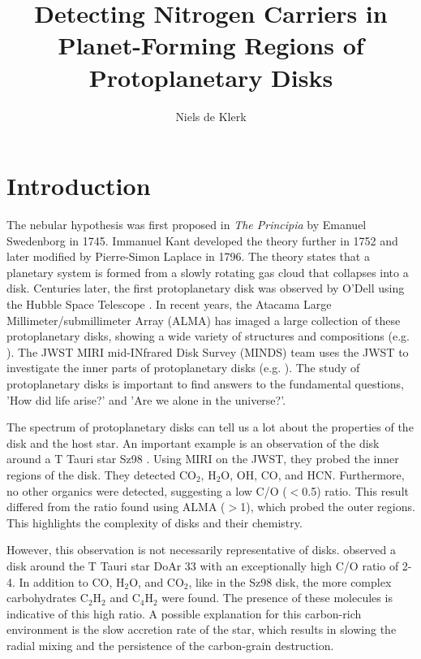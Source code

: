 \documentclass[twoside, single, authoryear, semicolon, 12pt]{lion-msc}
\title{Detecting Nitrogen Carriers in Planet-Forming Regions of Protoplanetary Disks}
\author{Niels de Klerk}
\affiliation{Leiden Observatory, Universiteit Leiden}
\date{\displaydate{date}}
\newcommand{\4}{$_4$}
\newcommand{\3}{$_3$}
\newcommand{\2}{$_2$}
\begin{document}

\maketitle

\tableofcontents
\cleardoublepage
{}
\chapter{Introduction}
The nebular hypothesis was first proposed in \textit{The Principia} by Emanuel Swedenborg in 1745. Immanuel Kant developed the theory further in 1752 and later modified by Pierre-Simon Laplace in 1796. The theory states that a planetary system is formed from a slowly rotating gas cloud that collapses into a disk. Centuries later, the first protoplanetary disk was observed by O'Dell using the Hubble Space Telescope \citep{ODell1993}. In recent years, the Atacama Large Millimeter/submillimeter Array (ALMA) has imaged a large collection of these protoplanetary disks, showing a wide variety of structures and compositions (e.g. \cite{gardner2025exoalmaxialmaobservations, shoshi2025alma2dsuperresolutionimaging}). The JWST MIRI mid-INfrared Disk Survey (MINDS) team uses the JWST to investigate the inner parts of protoplanetary disks (e.g. \cite{Arabhavi_2025, Vlasblom_2025}). The study of protoplanetary disks is important to find answers to the fundamental questions, 'How did life arise?' and 'Are we alone in the universe?'.

The spectrum of protoplanetary disks can tell us a lot about the properties of the disk and the host star. An important example is an observation of the disk around a T Tauri star Sz98 \citep{Gasman_2023}. Using MIRI on the JWST, they probed the inner regions of the disk. They detected CO$_2$, H$_2$O, OH, CO, and HCN. Furthermore, no other organics were detected, suggesting a low C/O ($<$0.5) ratio. This result differed from the ratio found using ALMA ($>$1), which probed the outer regions. This highlights the complexity of disks and their chemistry.

However, this observation is not necessarily representative of disks. \cite{colmenares2024jwstmiridetectioncarbonrichchemistry} observed a disk around the T Tauri star DoAr 33 with an exceptionally high C/O ratio of 2-4. In addition to CO, H\2O, and CO\2, like in the Sz98 disk, the more complex carbohydrates C\2H\2 and C\4H\2 were found. The presence of these molecules is indicative of this high ratio. A possible explanation for this carbon-rich environment is the slow accretion rate of the star, which results in slowing the radial mixing and the persistence of the carbon-grain destruction.
\end{document}
